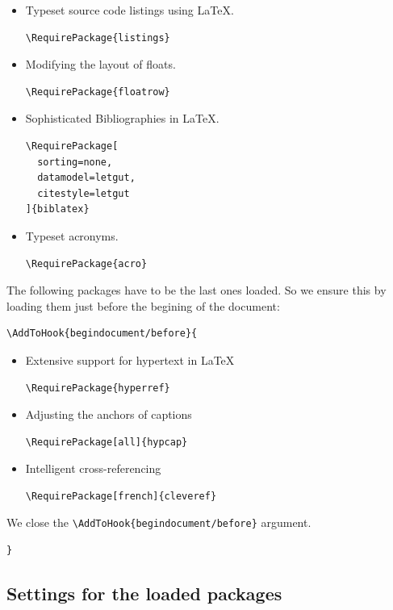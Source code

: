 \documentclass{letgut}
\begin{document}
\begin{itemize}
\item Typeset source code listings using \LaTeX{}.
\begin{lstlisting}
\RequirePackage{listings}
\end{lstlisting}
\item Modifying the layout of floats.
\begin{lstlisting}
\RequirePackage{floatrow}
\end{lstlisting}
\item Sophisticated Bibliographies in \LaTeX{}.
\begin{lstlisting}
\RequirePackage[
  sorting=none,
  datamodel=letgut,
  citestyle=letgut
]{biblatex}
\end{lstlisting}
\item Typeset acronyms.
\begin{lstlisting}
\RequirePackage{acro}
\end{lstlisting}
\end{itemize}

The following packages have to be the last ones loaded. So we ensure this by
loading them just before the begining of the document:
\begin{lstlisting}
\AddToHook{begindocument/before}{
\end{lstlisting}
\begin{itemize}
\item Extensive support for hypertext in \LaTeX{}
\begin{lstlisting}
\RequirePackage{hyperref}
\end{lstlisting}
\item Adjusting the anchors of captions
\begin{lstlisting}
\RequirePackage[all]{hypcap}
\end{lstlisting}
\item Intelligent cross-referencing
\begin{lstlisting}
\RequirePackage[french]{cleveref}
\end{lstlisting}
\end{itemize}
We close the \lstinline+\AddToHook{begindocument/before}+ argument.
\begin{lstlisting}
}
\end{lstlisting}

\subsection{Settings for the loaded packages}
\label{sec:org5c102e6}
\end{document}
